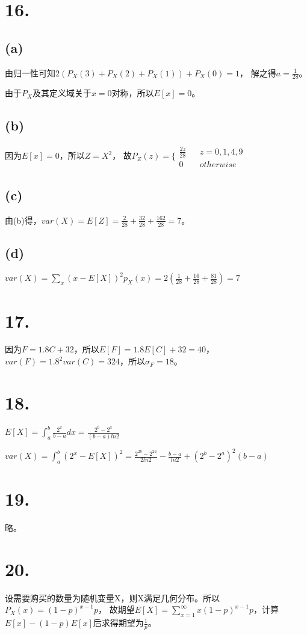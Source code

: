 \documentclass[UTF8]{report}
\begin{document}
    \section*{16.}
        \subsection*{(a)}
            由归一性可知$2(P_X(3) + P_X(2) +P_X(1)) + P_X(0) = 1$，
            解之得$a = \frac{1}{28}$。

            由于$P_X$及其定义域关于$x = 0$对称，所以$E[x] = 0$。
        \subsection*{(b)}
            因为$E[x] = 0$，所以$Z = X^2$，
            故$P_Z(z) = \{\begin{array}{lcr}
                \frac{2z}{28} & & z = 0, 1, 4, 9 \\
                0 & & otherwise
            \end{array}$
        \subsection*{(c)}
            由(b)得，$var(X) = E[Z] = \frac{2}{28} + \frac{32}{28} + \frac{162}{28} = 7$。
        \subsection*{(d)}
            $var(X) = \sum_{x}(x - E[X])^2p_X(x) = 2(\frac{1}{28} + \frac{16}{28} + \frac{81}{28}) = 7$
    \section*{17.}
        因为$F = 1.8C + 32$，所以$E[F] = 1.8E[C] + 32 = 40$，$var(F) = 1.8^2var(C) = 324$，所以$\sigma_F = 18$。
    \section*{18.}
        $E[X] = \int_a^b\frac{2^x}{b - a}dx = \frac{2^b - 2^a}{(b - a)ln2}$

        $var(X) = \int_a^b(2^x - E[X])^2 = \frac{2^{2b} - 2^{2a}}{2ln2} - \frac{b - a}{ln2} + (2^b - 2^a)^2(b - a)$
    \section*{19.}
        略。
    \section*{20.}
        设需要购买的数量为随机变量X，则X满足几何分布。所以$P_X(x) = (1 - p)^{x - 1}p$，
        故期望$E[X] = \sum_{x = 1}^{\infty}x(1 - p)^{x - 1}p$，计算$E[x] - (1 - p)E[x]$后求得期望为$\frac{1}{p}$。
\end{document}
